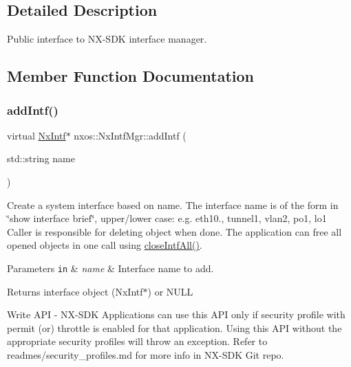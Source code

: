 \subsection{Detailed Description}
Public interface to N\+X-\/\+S\+DK interface manager. 

\subsection{Member Function Documentation}
\mbox{\label{classnxos_1_1_nx_intf_mgr_a818e4d019413e8111cbb9610e465f714}} 
\subsubsection{\texorpdfstring{add\+Intf()}{addIntf()}}
{\footnotesize\ttfamily virtual \mbox{\hyperlink{classnxos_1_1_nx_intf}{Nx\+Intf}}$\ast$ nxos\+::\+Nx\+Intf\+Mgr\+::add\+Intf (\begin{DoxyParamCaption}\item[{std\+::string}]{name }\end{DoxyParamCaption})\hspace{0.3cm}{\ttfamily [pure virtual]}}

Create a system interface based on name. The interface name is of the form in \char`\"{}show interface brief\char`\"{}, upper/lower case\+: e.\+g. eth10., tunnel1, vlan2, po1, lo1 Caller is responsible for deleting object when done. The application can free all opened objects in one call using \mbox{\hyperlink{classnxos_1_1_nx_intf_mgr_a45e7cb2a8e3919667c14264dd618168a}{close\+Intf\+All()}}. 
\begin{DoxyParams}[1]{Parameters}
\mbox{\tt in}  & {\em name} & Interface name to add. \\
\hline
\end{DoxyParams}
\begin{DoxyReturn}{Returns}
interface object (Nx\+Intf$\ast$) or N\+U\+LL
\end{DoxyReturn}
\begin{DoxyVerb}Write API - NX-SDK Applications can use this API only if security profile with permit (or) throttle is 
            enabled for that application. Using this API without the appropriate security profiles will
            throw an exception. Refer to readmes/security_profiles.md for more info in NX-SDK Git repo.
\end{DoxyVerb}



